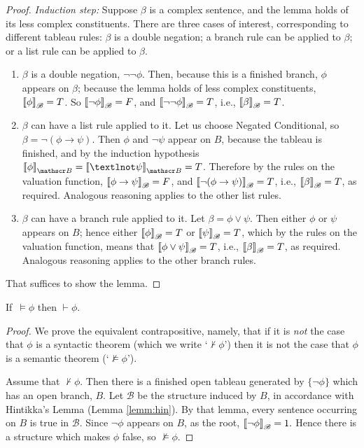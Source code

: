 \begin{proof}
\noindent\emph{Induction step:} Suppose $\beta$ is a complex sentence, and the lemma holds of its less complex constituents. There are three cases of interest, corresponding to different tableau rules: $\beta$ is a
double negation; a branch rule can be applied to $\beta$; or a list
rule can be applied to $\beta$. \begin{enumerate}
	\item $\beta$ is a double negation, $\neg\neg\phi$. Then, because this is a finished branch, $\phi$ appears on $\beta$; because the lemma holds of less complex constituents, $\left\llbracket \phi\right\rrbracket_{\mathscr{B}}=T$. So $\left\llbracket \neg\phi\right\rrbracket_{\mathscr{B}}=F$, and $\left\llbracket \neg\neg\phi\right\rrbracket_{\mathscr{B}}=T$, i.e., $\left\llbracket \beta\right\rrbracket_{\mathscr{B}}=T$.
  \item $\beta$ can have a list rule applied to it. Let us choose Negated
    Conditional, so $\beta = \neg(\phi \to \psi)$. Then $\phi$ and $\neg \psi$
    appear on $B$, because the tableau is finished, and by the induction hypothesis $\val{\phi}{B} = \val{¬\psi}{B} =T$. Therefore by the rules on the valuation function, $\left\llbracket \phi\to\psi\right\rrbracket_{\mathscr{B}}=F$, and $\left\llbracket \neg(\phi \to \psi)\right\rrbracket_{\mathscr{B}}=T$, i.e., $\left\llbracket \beta\right\rrbracket_{\mathscr{B}}=T$, as required. Analogous reasoning applies to the other list rules.
    \item $\beta$ can have a branch rule applied to it. Let $\beta = \phi
    \vee \psi$. Then either $\phi$ or $\psi$ appears on $B$; hence either $\left\llbracket \phi\right\rrbracket_{\mathscr{B}} = T$ or $\left\llbracket \psi\right\rrbracket_{\mathscr{B}} =T$, which by the rules on the valuation function, means that $\left\llbracket \phi\vee\psi\right\rrbracket_{\mathscr{B}}=T$,  i.e., $\left\llbracket \beta\right\rrbracket_{\mathscr{B}}=T$, as required. Analogous reasoning applies to the other branch rules.
\end{enumerate}
    That suffices to show the lemma.\end{proof}



\begin{theorem}\label{thm:comp} If\, $\vDash \phi$ then $\vdash \phi$.\end{theorem}
\begin{proof} We prove the equivalent contrapositive, namely, that if it is {\em not} the case that $\phi$ is a syntactic theorem (which we write `$\nvdash \phi$') then it is not the case that $\phi$ is a semantic theorem (`$\nvDash \phi$').
    
Assume that $\nvdash \phi$. Then there is a finished open tableau generated by $\{\neg\phi\}$ which has an open branch, $B$. Let $\mathscr{B}$ be the structure induced by $B$, in accordance with Hintikka's Lemma (Lemma \ref{lemm:hin}). By that lemma, every sentence occurring on $B$ is true in $\mathscr{B}$. Since $\neg\phi$ appears on $B$, as the root, $\left\llbracket \neg\phi\right\rrbracket_{\mathscr{B}}=1.$ Hence there is a structure which makes $\phi$ false, so $\nvDash \phi$.
\end{proof}

